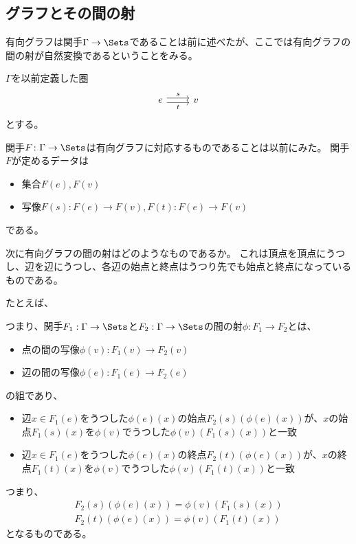 \documentclass[uplatex]{jsarticle}
\begin{document}
\subsection{グラフとその間の射}
有向グラフは関手$\Gamma \to \Sets$であることは前に述べたが、ここでは有向グラフの間の射が自然変換であるということをみる。

$\Gamma$を以前定義した圏
\[
\begin{tikzcd}
e \ar[r,shift left, "s"] \ar[r, shift right, "t"'] & v
\end{tikzcd}
\]
とする。

関手$F\colon\Gamma\to \Sets$は有向グラフに対応するものであることは以前にみた。
関手$F$が定めるデータは
\begin{itemize}
\item 集合$F(e), F(v)$
\item 写像$F(s)\colon F(e)\to F(v), F(t)\colon F(e)\to F(v)$
\end{itemize}
である。

次に有向グラフの間の射はどのようなものであるか。
これは頂点を頂点にうつし、辺を辺にうつし、各辺の始点と終点はうつり先でも始点と終点になっているものである。

たとえば、

つまり、関手$F_1:\Gamma \to \Sets$と$F_2:\Gamma \to \Sets$の間の射$\phi:F_1 \to F_2$とは、
\begin{itemize}
\item 点の間の写像$\phi(v):F_1(v) \to F_2(v)$
\item 辺の間の写像$\phi(e):F_1(e) \to F_2(e)$
\end{itemize}
の組であり、
\begin{itemize}
\item 辺$x \in F_1(e)$をうつした$\phi(e)(x)$の始点$F_2(s)(\phi(e)(x))$が、$x$の始点$F_1(s)(x)$を$\phi(v)$でうつした$\phi(v)(F_1(s)(x))$と一致
\item 辺$x \in F_1(e)$をうつした$\phi(e)(x)$の終点$F_2(t)(\phi(e)(x))$が、$x$の終点$F_1(t)(x)$を$\phi(v)$でうつした$\phi(v)(F_1(t)(x))$と一致
\end{itemize}
つまり、
\begin{align*}
F_2(s)(\phi(e)(x))=\phi(v)(F_1(s)(x))\\
F_2(t)(\phi(e)(x))=\phi(v)(F_1(t)(x))
\end{align*}
となるものである。
\end{document}
